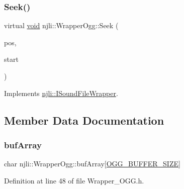 \subsubsection{\texorpdfstring{Seek()}{Seek()}}
{\footnotesize\ttfamily virtual \mbox{\hyperlink{_thread_8h_af1e856da2e658414cb2456cb6f7ebc66}{void}} njli\+::\+Wrapper\+Ogg\+::\+Seek (\begin{DoxyParamCaption}\item[{size\+\_\+t}]{pos,  }\item[{\mbox{\hyperlink{classnjli_1_1_i_sound_file_wrapper_ab4b07720cb2823b4f3f9fa98ee07a6e7}{S\+E\+E\+K\+\_\+\+P\+OS}}}]{start }\end{DoxyParamCaption})\hspace{0.3cm}{\ttfamily [virtual]}}



Implements \mbox{\hyperlink{classnjli_1_1_i_sound_file_wrapper_a22241a77b7d6adf55045a7a30ec5ef30}{njli\+::\+I\+Sound\+File\+Wrapper}}.



\subsection{Member Data Documentation}
\mbox{\label{classnjli_1_1_wrapper_ogg_aa353b7ba5e112e1160689397d0a90de1}} 
\subsubsection{\texorpdfstring{buf\+Array}{bufArray}}
{\footnotesize\ttfamily char njli\+::\+Wrapper\+Ogg\+::buf\+Array\mbox{[}\mbox{\hyperlink{_wrapper___o_g_g_8h_a19906647bd966757e5f2acd00f34023d}{O\+G\+G\+\_\+\+B\+U\+F\+F\+E\+R\+\_\+\+S\+I\+ZE}}\mbox{]}\hspace{0.3cm}{\ttfamily [private]}}



Definition at line 48 of file Wrapper\+\_\+\+O\+G\+G.\+h.

\mbox{\label{classnjli_1_1_wrapper_ogg_ae96fb224e50879ef50c3021fa09ea890}} 
